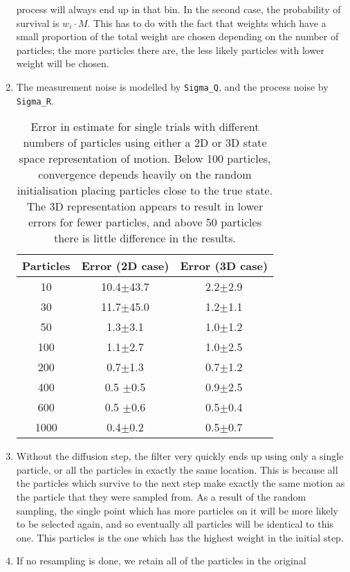 \documentclass[a4paper,12pt]{article}
\begin{document}
\begin{enumerate}
  process will always end up in that bin. In the second case, the probability of
  survival is $w_i\cdot M$. This has to do with the fact that weights which have
  a small proportion of the total weight are chosen depending on the number of
  particles; the more particles there are, the less likely particles with lower
  weight will be chosen.
\item The measurement noise is modelled by \texttt{Sigma\_Q}, and the process
  noise by \texttt{Sigma\_R}.
  \begin{table}
    \centering
    \begin{tabular}{c|cc}
      Particles & Error (2D case)     & Error (3D case)   \\\hline
      10 & 10.4$\pm$43.7 & 2.2$\pm$2.9 \\
      30 & 11.7$\pm$45.0 & 1.2$\pm$1.1 \\
      50 & 1.3$\pm$3.1   & 1.0$\pm$1.2 \\
      100 & 1.1$\pm$2.7   & 1.0$\pm$2.5 \\
      200 & 0.7$\pm$1.3   & 0.7$\pm$1.2 \\
      400 & 0.5 $\pm$0.5  & 0.9$\pm$2.5 \\
      600 & 0.5 $\pm$0.6  & 0.5$\pm$0.4 \\
      1000 & 0.4$\pm$0.2   & 0.5$\pm$0.7 \\
    \end{tabular}
    \caption{Error in estimate for single trials with different numbers of particles using either a 2D or 3D
      state space representation of motion. Below 100 particles, convergence
      depends heavily on the random initialisation placing particles close to
      the true state. The 3D representation appears to result in lower errors
      for fewer particles, and above 50 particles there is little difference in
      the results.}
    \label{tab:2drep}
  \end{table}
\item Without the diffusion step, the filter very quickly ends up using only a
  single particle, or all the particles in exactly the same location. This is
  because all the particles which survive to the next step make exactly the same
  motion as the particle that they were sampled from. As a result of the random
  sampling, the single point which has more particles on it will be more likely
  to be selected again, and so eventually all particles will be identical to
  this one. This particles is the one which has the highest weight in the
  initial step.
\item If no resampling is done, we retain all of the particles in the original

\end{enumerate}
\end{document}
